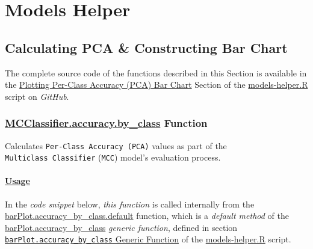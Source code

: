 \documentclass[
]{report}
\begin{document}
\newpage

\section{Models Helper}\label{appndx_a.models.helper}

\subsection{Calculating PCA \& Constructing Bar Chart}\label{appndx_a.mh.calc_pca.bar_chart}

\begin{noteblock}
The complete source code of the functions described in this Section is available in the \href{https://github.com/AzKurban-edX-DS/edx.capstone.choose-your-own/tree/main/r/support-functions/models-helper.R\#L891-L1108}{Plotting Per-Class Accuracy (PCA) Bar Chart} Section of the \href{https://github.com/AzKurban-edX-DS/edx.capstone.choose-your-own/tree/main/r/support-functions/models-helper.R}{models-helper.R} script on \emph{GitHub}.

\end{noteblock}

\subsubsection{\texorpdfstring{\href{https://github.com/AzKurban-edX-DS/edx.capstone.choose-your-own/blob/main/r/support-functions/models-helper.R\#L901}{MCClassifier.accuracy.by\_class} Function}{MCClassifier.accuracy.by\_class Function}}\label{func.MCClassifier.accuracy.by_class}

\hfill\break

Calculates \texttt{Per-Class\ Accuracy\ (PCA)} values as part of the \texttt{Multiclass\ Classifier} (\texttt{MCC}) model's evaluation process.

\protect{}\label{func.MCClassifier.accuracy.by_class.usage}
\paragraph{\texorpdfstring{\href{https://github.com/AzKurban-edX-DS/edx.capstone.choose-your-own/blob/main/r/support-functions/models-helper.R\#L1057}{Usage}}{Usage}}\label{usage-5}

\hfill\break

In the \emph{code snippet} below, \emph{this function} is called internally from the \href{https://github.com/AzKurban-edX-DS/edx.capstone.choose-your-own/blob/main/r/support-functions/models-helper.R\#L1033}{barPlot.accuracy\_by\_class.default} function, which is a \emph{default method} of the \href{https://github.com/AzKurban-edX-DS/edx.capstone.choose-your-own/blob/main/r/support-functions/models-helper.R\#L968}{barPlot.accuracy\_by\_class} \emph{generic function}, defined in section \href{https://github.com/AzKurban-edX-DS/edx.capstone.choose-your-own/blob/main/r/support-functions/models-helper.R\#L963}{\texttt{barPlot.accuracy\_by\_class} Generic Function} of the \href{https://github.com/AzKurban-edX-DS/edx.capstone.choose-your-own/blob/main/r/support-functions/models-helper.R}{models-helper.R} script.
\end{document}
